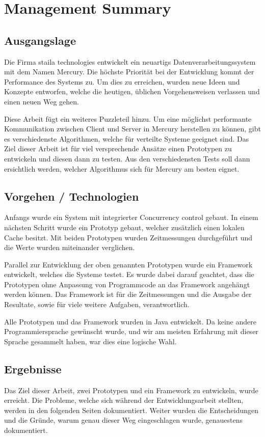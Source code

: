 \chapter*{Management Summary}

\section*{Ausgangslage}
Die Firma staila technologies ent\-wick\-elt ein neuartigs Daten\-ver\-arbeitungs\-system mit dem Namen Mercury. Die höchste Priorität bei der Entwicklung kommt der Performance des Systems zu. Um dies zu erreichen, wurden neue Ideen und Konzepte entworfen, welche die heutigen, üblichen Vorgehensweisen verlassen und einen neuen Weg gehen.

Diese Arbeit fügt ein weiteres Puzzleteil hinzu. Um eine möglichst performante Kommunikation zwischen Client und Server in Mercury herstellen zu können, gibt es verschiedenste Algorithmen, welche für verteilte Systeme geeignet sind. Das Ziel dieser Arbeit ist für viel versprechende Ansätze einen Prototypen zu entwickeln und diesen dann zu testen. Aus den verschiedensten Tests soll dann ersichtlich werden, welcher Algorithmus sich für Mercury am besten eignet.

\section*{Vorgehen / Technologien}
Anfangs wurde ein System mit integrierter Concurrency control gebaut. In einem nächsten Schritt wurde ein Prototyp gebaut, welcher zusätzlich einen lokalen Cache besitzt. Mit beiden Prototypen wurden Zeitmessungen durchgeführt und die Werte wurden miteinander verglichen.

Parallel zur Ent\-wick\-lung der oben ge\-nannten Pro\-to\-typ\-en wur\-de ein Frame\-work entwickelt, welches die Systeme testet. Es wurde dabei darauf geachtet, dass die Prototypen ohne Anpassung von Programmcode an das Framework angehängt werden können. Das Framework ist für die Zeitmessungen und die Ausgabe der Resultate, sowie für viele weitere Aufgaben, verantwortlich.

Alle Prototypen und das Framework wurden in Java entwickelt. Da keine andere Programmiersprache gewünscht wurde, und wir am meisten Erfahrung mit dieser Sprache gesammelt haben, war dies eine logische Wahl.

\section*{Ergebnisse}
Das Ziel dieser Arbeit, zwei Prototypen und ein Framework zu entwickeln, wurde erreicht. Die Probleme, welche sich während der Entwicklungsarbeit stellten, werden in den folgenden Seiten dokumentiert. Weiter wurden die Entscheidungen und die Gründe, warum genau dieser Weg eingeschlagen wurde, genauestens dokumentiert.

